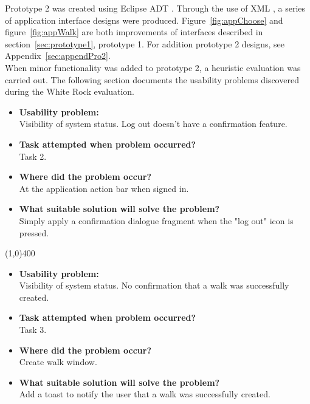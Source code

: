 \documentclass[11pt,a4paper]{article}
\begin{document}
Prototype 2 was created using Eclipse ADT \cite{eclipse}. Through the use of XML \cite{xml}, a series of application interface designs were produced. Figure~\ref{fig:appChoose} and figure~\ref{fig:appWalk} are both improvements of interfaces described in section~\ref{sec:prototype1}, prototype 1. For addition prototype 2 designs, see Appendix~\ref{sec:appendPro2}.\\

When minor functionality was added to prototype 2, a heuristic evaluation was carried out. The following section documents the usability problems discovered during the White Rock evaluation. 

\begin{itemize}
	\item\textbf{Usability problem:}\\
	Visibility of system status. Log out doesn't have a confirmation feature.

	\item\textbf{Task attempted when problem occurred?}\\
	Task 2.

	\item\textbf{Where did the problem occur?}\\
	At the application action bar when signed in.

	\item\textbf{What suitable solution will solve the problem?}\\
	Simply apply a confirmation dialogue fragment when the "log out" icon is pressed.

\end{itemize}

\line(1,0){400}

\begin{itemize}
	\item\textbf{Usability problem:}\\
	Visibility of system status. No confirmation that a walk was successfully created.

	\item\textbf{Task attempted when problem occurred?}\\
	Task 3.

	\item\textbf{Where did the problem occur?}\\
	Create walk window.

	\item\textbf{What suitable solution will solve the problem?}\\
	Add a toast to notify the user that a walk was successfully created.

\end{itemize}
\end{document}
